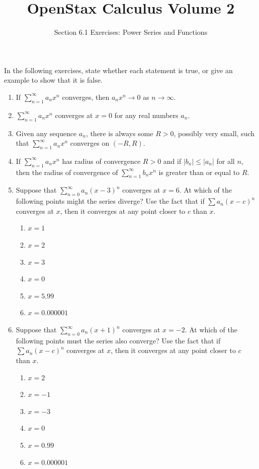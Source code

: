 \documentclass{exercises}
\title{OpenStax Calculus Volume 2}
\subtitle{Section 6.1 Exercises: Power Series and Functions}
\author{}
\date{}
\begin{document}
\maketitle


In the following exercises, state whether each statement is true, or give an example to show that it is false.

\begin{enumerate}[start=1]
\item If $\sum_{n=1}^{\infty}a_{n}x^{n}$ converges, then $a_{n}x^{n}\to0$ as $n\to \infty$.
\item $\sum_{n=1}^{\infty}a_{n}x^{n}$ converges at $x=0$ for any real numbers $a_{n}$.
\item Given any sequence $a_{n}$, there is always some $R>0$, possibly very small, such that $\sum_{n=1}^{\infty}a_{n}x^{n}$ converges on $(-R,R)$.
\item If $\sum_{n=1}^{\infty}a_{n}x^{n}$ has radius of convergence $R>0$ and if $|b_{n}|\le|a_{n}|$ for all $n$, then the radius of convergence of $\sum_{n=1}^{\infty}b_{n}x^{n}$ is greater than or equal to $R$.
\item Suppose that $\sum_{n=0}^{\infty}a_{n}{(x-3)}^{n}$ converges at $x=6$. At which of the following points might the series diverge? Use the fact that if $\sum a_{n}{(x-c)}^{n}$ converges at $x$, then it converges at any point closer to $c$ than $x$.
\begin{enumerate}[label=(\alph*)]
  \item $x=1$
  \item $x=2$
  \item $x=3$
  \item $x=0$
  \item $x=5.99$
  \item $x=0.000001$
\end{enumerate}
\item Suppose that $\sum_{n=0}^{\infty}a_{n}{(x+1)}^{n}$ converges at $x=-2$. At which of the following points must the series also converge? Use the fact that if $\sum a_{n}{(x-c)}^{n}$ converges at $x$, then it converges at any point closer to $c$ than $x$.
\begin{enumerate}[label=(\alph*)]
  \item $x=2$
  \item $x=-1$
  \item $x=-3$
  \item $x=0$
  \item $x=0.99$
  \item $x=0.000001$
\end{enumerate}
\end{enumerate}
\end{document}
